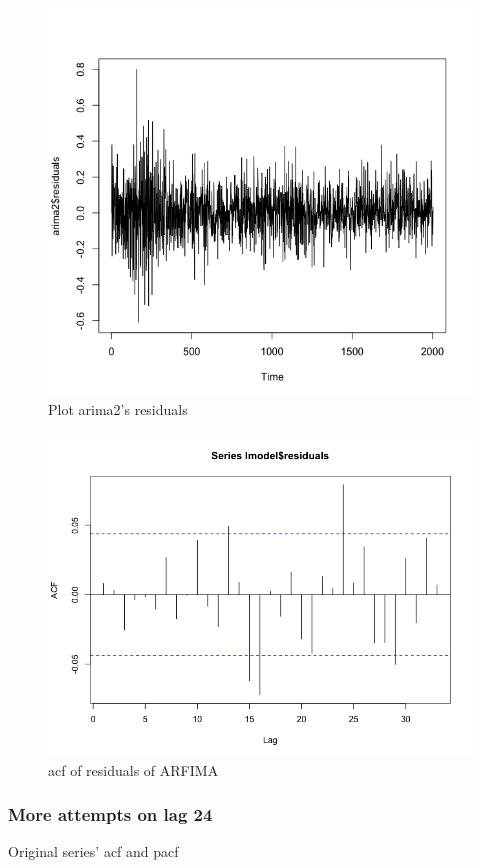 \documentclass[a4paper,10pt]{article}
\begin{document}
\begin{figure}[H]
\centering
\caption{Plot arima2's residuals}
\includegraphics[scale=.5]{arima_residuals.png}
\end{figure}

\begin{figure}[H]
\centering
\caption{acf of residuals of ARFIMA}
\includegraphics[scale=.5]{longacf.png}
\end{figure}


\subsubsection{More attempts on lag 24}
Original series' acf and pacf
\end{document}
